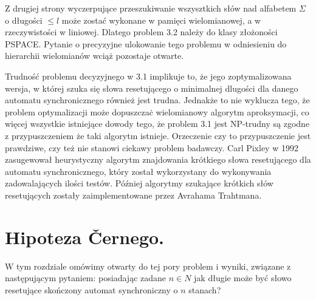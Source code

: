 \documentclass[12pt,a4paper]{article}
\begin{document}
Z drugiej strony wyczerpuj\k{a}ce przeszukiwanie wszysztkich s{\l}\'ow nad alfabetem $\Sigma$ o d{\l}ugo\'sci $\leq l$ mo\.ze zosta\'c wykonane w pami\k{e}ci wielomianowej, a w rzeczywisto\'sci w liniowej. Dlatego problem 3.2 nale\.zy do klasy z{\l}o\.zono\'sci PSPACE. Pytanie o precyzyjne ulokowanie tego problemu w odniesieniu do hierarchii wielomian\'ow wci\k{a}\.z pozostaje otwarte. 

Trudno\'s\'c problemu decyzyjnego w 3.1 implikuje to, \.ze jego zoptymalizowana wersja, w kt\'orej szuka si\k{e} s{\l}owa resetuj\k{a}cego o minimalnej d{l}ugo\'sci dla danego automatu synchronicznego r\'ownie\.z jest trudna. Jednak\.ze to nie wyklucza tego, \.ze problem optymalizacji mo\.ze dopuszcza\.c wielomianowy algorytm aproksymacji, co wi\k{e}cej wszystkie istniej\k{a}ce dowody tego, \.ze problem 3.1 jest NP-trudny s\k{a} zgodne z  przypuszczeniem \.ze taki algorytm istnieje. Orzeczenie czy to przypuszczenie jest prawdziwe, czy te\.z nie stanowi ciekawy problem badawczy. Carl Pixley w 1992 zasugewowa{\l} heurystyczny algorytm znajdowania kr\'otkiego s{\l}owa resetuj\k{a}cego dla automatu synchronicznego, kt\'ory zosta{\l} wykorzystany do wykonywania zadowalaj\k{a}cych ilo\'sci test\'ow. P\'o\'zniej algorytmy szukaj\k{a}ce kr\'otkich s{\l}\'ow resetuj\k{a}cych zosta{\l}y zaimplementowane przez Avrahama Trahtmana.


\newpage
\section{Hipoteza \v Cernego.}

W tym rozdziale om\'{o}wimy otwarty do tej pory problem i wyniki, zwi\k{a}zane z nast\k{e}puj\k{a}cym pytaniem: posiadaj\k{a}c zadane $n \in N$ jak d{\l}ugie mo\.ze by\'c s{\l}owo resetuj\k{a}ce sko\'nczony automat synchroniczny o $n$ stanach? 
\end{document}
